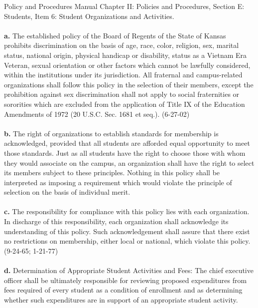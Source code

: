 Policy and Procedures Manual Chapter II: Policies and Procedures, Section E:
Students, Item 6: Student Organizations and Activities.
\\
\\
\textbf{a.} The established policy of the Board of Regents of the State of
Kansas prohibits discrimination on the basis of age, race, color, religion, sex,
marital status, national origin, physical handicap or disability, status as a
Vietnam Era Veteran, sexual orientation or other factors which cannot be
lawfully considered, within the institutions under its jurisdiction. All
fraternal and campus-related organizations shall follow this policy in the
selection of their members, except the prohibition against sex discrimination
shall not apply to social fraternities or sororities which are excluded from the
application of Title IX of the Education Amendments of 1972 (20 U.S.C. Sec. 1681
et seq.). (6-27-02)
\\
\\
\textbf{b.} The right of organizations to establish standards for membership is
acknowledged, provided that all students are afforded equal opportunity to meet
those standards. Just as all students have the right to choose those with whom
they would associate on the campus, an organization shall have the right to
select its members subject to these principles. Nothing in this policy shall be
interpreted as imposing a requirement which would violate the principle of
selection on the basis of individual merit.
\\
\\
\textbf{c.} The responsibility for compliance with this policy lies with each
organization. In discharge of this responsibility, each organization shall
acknowledge its understanding of this policy. Such acknowledgement shall assure
that there exist no restrictions on membership, either local or national, which
violate this policy. (9-24-65; 1-21-77)
\\
\\
\textbf{d.} Determination of Appropriate Student Activities and Fees: The chief
executive officer shall be ultimately responsible for reviewing proposed
expenditures from fees required of every student as a condition of enrollment
and as determining whether such expenditures are in support of an appropriate
student activity.



